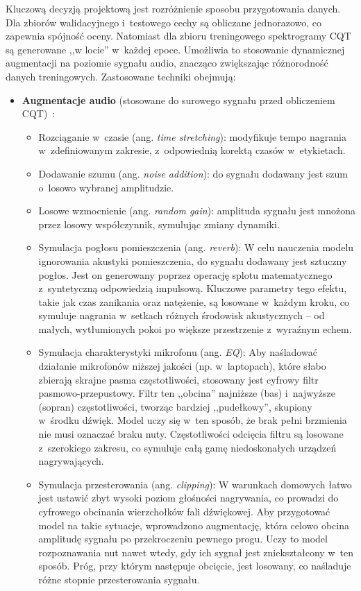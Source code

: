 Kluczową decyzją projektową jest rozróżnienie sposobu przygotowania danych. Dla zbiorów walidacyjnego i~testowego cechy są obliczane jednorazowo, co zapewnia spójność oceny. Natomiast dla zbioru treningowego spektrogramy CQT są generowane ,,w locie'' w~każdej epoce. Umożliwia to stosowanie dynamicznej augmentacji na poziomie sygnału audio, znacząco zwiększając różnorodność danych treningowych. Zastosowane techniki obejmują:
\begin{itemize}
    \item \textbf{Augmentacje audio} (stosowane do surowego sygnału przed obliczeniem CQT)~\autocite{KlapuriDavy2006SignalProcessing, Benetos2019AutomaticMusicTranscription}:
    \begin{itemize}
        \item Rozciąganie w~czasie (ang. \textit{time stretching}): modyfikuje tempo nagrania w~zdefiniowanym zakresie, z~odpowiednią korektą czasów w~etykietach.
        \item Dodawanie szumu (ang. \textit{noise addition}): do sygnału dodawany jest szum o~losowo wybranej amplitudzie.
        \item Losowe wzmocnienie (ang. \textit{random gain}): amplituda sygnału jest mnożona przez losowy współczynnik, symulując zmiany dynamiki.
        \item Symulacja pogłosu pomieszczenia (ang. \textit{reverb}): W celu nauczenia modelu ignorowania akustyki pomieszczenia, do sygnału dodawany jest sztuczny pogłos. Jest on generowany poprzez operację splotu matematycznego z~syntetyczną odpowiedzią impulsową. Kluczowe parametry tego efektu, takie jak czas zanikania oraz natężenie, są losowane w~każdym kroku, co symuluje nagrania w~setkach różnych środowisk akustycznych – od małych, wytłumionych pokoi po większe przestrzenie z~wyraźnym echem.
        \item Symulacja charakterystyki mikrofonu (ang. \textit{EQ}): Aby naśladować działanie mikrofonów niższej jakości (np. w~laptopach), które słabo zbierają skrajne pasma częstotliwości, stosowany jest cyfrowy filtr pasmowo-przepustowy. Filtr ten ,,obcina'' najniższe (bas) i~najwyższe (sopran) częstotliwości, tworząc bardziej ,,pudełkowy'', skupiony w~środku dźwięk. Model uczy się w~ten sposób, że brak pełni brzmienia nie musi oznaczać braku nuty. Częstotliwości odcięcia filtru są losowane z~szerokiego zakresu, co symuluje całą gamę niedoskonałych urządzeń nagrywających.
        \item Symulacja przesterowania (ang. \textit{clipping}): W warunkach domowych łatwo jest ustawić zbyt wysoki poziom głośności nagrywania, co prowadzi do cyfrowego obcinania wierzchołków fali dźwiękowej. Aby przygotować model na takie sytuacje, wprowadzono augmentację, która celowo obcina amplitudę sygnału po przekroczeniu pewnego progu. Uczy to model rozpoznawania nut nawet wtedy, gdy ich sygnał jest zniekształcony w~ten sposób. Próg, przy którym następuje obcięcie, jest losowany, co naśladuje różne stopnie przesterowania sygnału.

\end{itemize}
\end{itemize}
